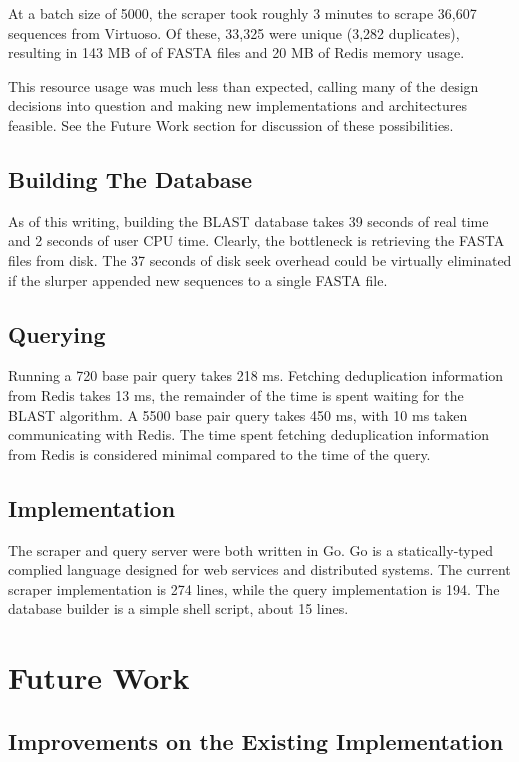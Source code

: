 \documentclass[journal,comsoc]{IEEEtran}
\begin{document}
At a batch size of 5000, the scraper took roughly 3 minutes to scrape 36,607 sequences
from Virtuoso. Of these, 33,325 were unique (3,282 duplicates), resulting in 143 MB of
of FASTA files and 20 MB of Redis memory usage.

This resource usage was much less than expected, calling many of the design 
decisions into question and making new implementations and architectures feasible.
See the Future Work section for discussion of these possibilities.

\subsection{Building The Database}

As of this writing, building the BLAST database takes 39 seconds of real time 
and 2 seconds of user CPU time. Clearly, the bottleneck is retrieving the FASTA files from
disk. The 37 seconds of disk seek overhead could be virtually eliminated if the slurper
appended new sequences to a single FASTA file.

\subsection{Querying}

Running a 720 base pair query takes 218 ms. Fetching deduplication information
from Redis takes 13 ms, the remainder of the time is spent waiting for the BLAST
algorithm. A 5500 base pair query takes 450 ms, with 10 ms taken communicating 
with Redis. The time spent fetching deduplication information from Redis is 
considered minimal compared to the time of the query.



\subsection{Implementation}

The scraper and query server were both written in Go. Go is a statically-typed
complied language designed for web services and distributed systems. The current
scraper implementation is 274 lines, while the query implementation is 194. The 
database builder is a simple shell script, about 15 lines.


\section{Future Work}

\subsection{Improvements on the Existing Implementation}
\end{document}
